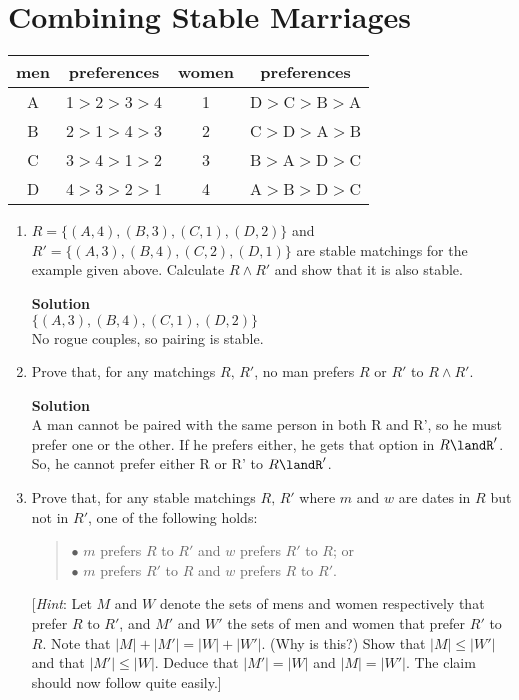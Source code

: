 \documentclass[11pt]{article}
\newcommand*{\Question}[1]{\section{#1}}
\newenvironment{Parts}{\begin{enumerate}[label=(\alph*)]}{\end{enumerate}}
\newcommand*{\Part}{\item}
\begin{document}
\Question{Combining Stable Marriages}

\begin{center}
\begin{tabular}{|c|c||c|c|}\hline
men&preferences& women & preferences \\
\hline
A& 1$>$2$>$3$>$4& 1 & D$>$C$>$B$>$A \\
\hline
B&2$>$1$>$4$>$3 & 2 & C$>$D$>$A$>$B  \\
\hline
C&3$>$4$>$1$>$2 & 3 & B$>$A$>$D$>$C  \\
\hline
D&4$>$3$>$2$>$1 & 4 & A$>$B$>$D$>$C  \\
\hline
\end{tabular}
\end{center}

\begin{Parts}
\Part $R=\{(A,4),(B,3),(C,1),(D,2)\}$ and
$R'=\{(A,3),(B,4),(C,2),(D,1)\}$ are stable matchings for the
example given above. Calculate $R \land R'$
and show that it is also stable.

\begin{mdframed} \textbf{Solution} \\
$\{(A,3),(B,4),(C,1),(D,2)\}$ \\
No rogue couples, so pairing is stable.
\end{mdframed}

\Part Prove that, for any matchings $R,\,R'$,
no man prefers $R$ or $R'$ to $R \land R'$.

\begin{mdframed} \textbf{Solution} \\
A man cannot be paired with the same person in both R and R', so he must prefer one or the other. If he prefers either, he gets that option in $R\landR'$. So, he cannot prefer either R or R' to $R\landR'$.
\end{mdframed}

\Part  Prove that, for any stable matchings $R,\,R'$
where $m$ and $w$ are dates in $R$ but not in $R'$, one of the following
holds:
\begin{quote}
$\bullet$ $m$ prefers $R$ to $R'$ and $w$ prefers $R'$ to $R$; or\\
$\bullet$ $m$ prefers $R'$ to $R$ and $w$ prefers $R$ to $R'$.
\end{quote}
[\textit{Hint}: Let $M$ and $W$ denote the sets of mens and women respectively
that prefer $R$ to $R'$, and $M'$ and $W'$ the sets of men and women that prefer $R'$ to $R$.  Note that $|M|+|M'|=|W|+|W'|$. (Why is this?) Show that $|M| \leq |W'|$ and that $|M'| \leq |W|$.  Deduce that $|M'|=|W|$ and $|M|=|W'|$.  The claim should now follow quite easily.]


\end{Parts}
\end{document}
